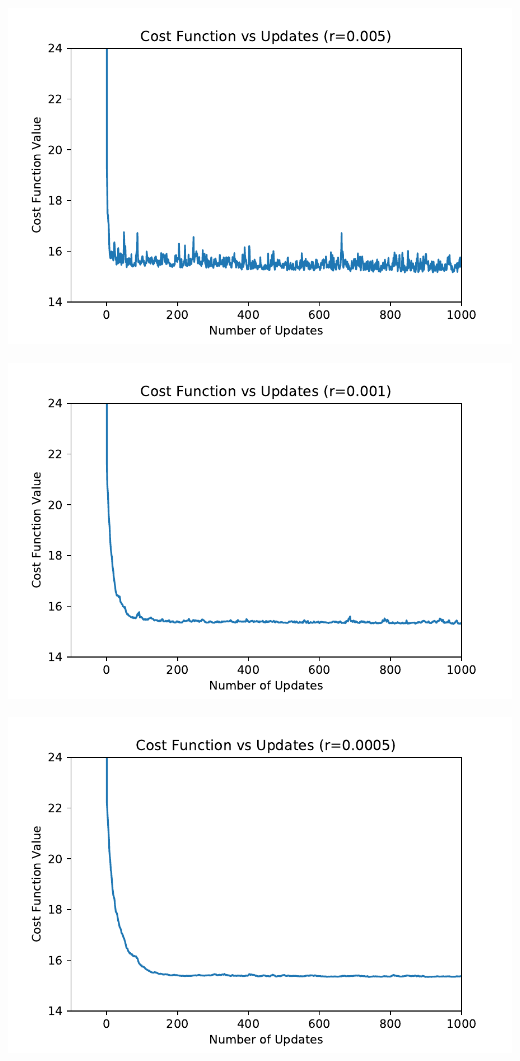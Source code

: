 \documentclass[12pt, fullpage,letterpaper]{article}
\begin{document}
\begin{enumerate}
\begin{enumerate}
		\includegraphics{r005.pdf}
		
		\includegraphics{r001.pdf}
		
		\includegraphics{r0005.pdf}
		

\end{enumerate}
\end{enumerate}
\end{document}
